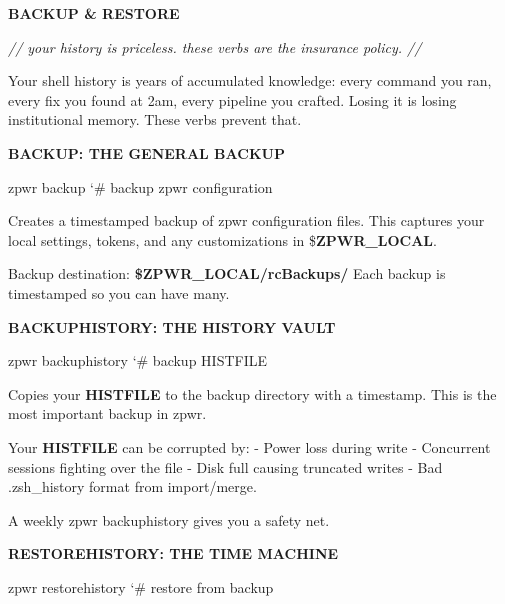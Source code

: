\documentclass[11pt,a4paper,twoside]{book}
\begin{document}
\vspace{10pt}
{\large\bfseries\color{neoncyan} BACKUP \& RESTORE}\vspace{6pt}

{\small\itshape\color{dimtext} // your history is priceless. these verbs are the insurance policy. //}

Your shell history is years of accumulated knowledge: every command you ran, every fix you found at 2am, every pipeline you crafted. Losing it is losing institutional memory. These verbs prevent that.


\vspace{12pt}
{\bfseries\color{neonyellow} BACKUP: THE GENERAL BACKUP}\vspace{4pt}

\begin{codebox}
\color{neongreen}zpwr backup                         {\char`\#} backup zpwr configuration\\
\end{codebox}

Creates a timestamped backup of zpwr configuration files. This captures your local settings, tokens, and any customizations in \$\textbf{ZPWR\_LOCAL}.

Backup destination: \textbf{\$ZPWR\_LOCAL/rcBackups/} Each backup is timestamped so you can have many.


\vspace{12pt}
{\bfseries\color{neonyellow} BACKUPHISTORY: THE HISTORY VAULT}\vspace{4pt}

\begin{codebox}
\color{neongreen}zpwr backuphistory                  {\char`\#} backup HISTFILE\\
\end{codebox}

Copies your \textbf{HISTFILE} to the backup directory with a timestamp. This is the most important backup in zpwr.

Your \textbf{HISTFILE} can be corrupted by: - Power loss during write - Concurrent sessions fighting over the file - Disk full causing truncated writes - Bad .zsh\_history format from import/merge.

A weekly zpwr backuphistory gives you a safety net.


\vspace{12pt}
{\bfseries\color{neonyellow} RESTOREHISTORY: THE TIME MACHINE}\vspace{4pt}

\begin{codebox}
\color{neongreen}zpwr restorehistory                 {\char`\#} restore from backup\\
\end{codebox}
\end{document}
